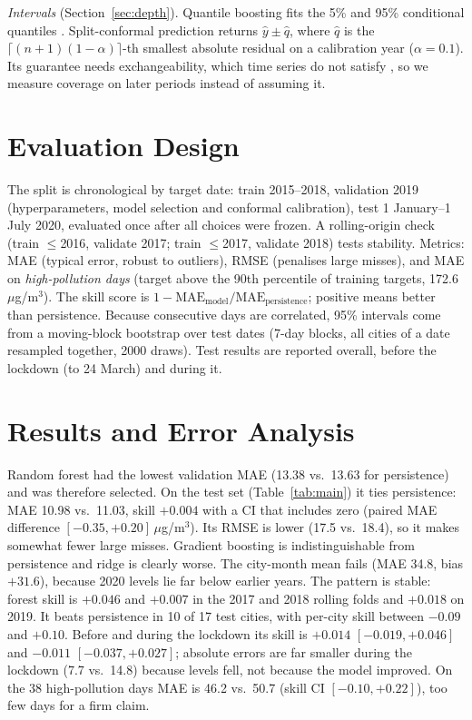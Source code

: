 \documentclass{article}
\begin{document}
\emph{Intervals} (Section~\ref{sec:depth}). Quantile boosting fits the 5\% and 95\% conditional quantiles \citep{koenker}. Split-conformal prediction \citep{lei} returns $\hat y\pm\hat q$, where $\hat q$ is the $\lceil (n{+}1)(1{-}\alpha)\rceil$-th smallest absolute residual on a calibration year ($\alpha=0.1$). Its guarantee needs exchangeability, which time series do not satisfy \citep{barber}, so we measure coverage on later periods instead of assuming it.

\section{Evaluation Design}
The split is chronological by target date: train 2015--2018, validation 2019 (hyperparameters, model selection and conformal calibration), test 1 January--1 July 2020, evaluated once after all choices were frozen. A rolling-origin check (train $\le$2016, validate 2017; train $\le$2017, validate 2018) tests stability. Metrics: MAE (typical error, robust to outliers), RMSE (penalises large misses), and MAE on \emph{high-pollution days} (target above the 90th percentile of training targets, 172.6\,$\mu$g/m$^3$). The skill score is $1-\mathrm{MAE}_{\text{model}}/\mathrm{MAE}_{\text{persistence}}$; positive means better than persistence. Because consecutive days are correlated, 95\% intervals come from a moving-block bootstrap \citep{kunsch} over test dates (7-day blocks, all cities of a date resampled together, 2000 draws). Test results are reported overall, before the lockdown (to 24 March) and during it.

\section{Results and Error Analysis}
\begin{table}[t]
\caption{2020 test results ($n=3013$; MAE and RMSE in $\mu$g/m$^3$; high $=$ 38 days above 172.6; pre/lock $=$ before/during lockdown). Skill is relative to persistence with block-bootstrap 95\% CI.}
\label{tab:main}
\centering\small\setlength{\tabcolsep}{3pt}

\end{table}
Random forest had the lowest validation MAE (13.38 vs.\ 13.63 for persistence) and was therefore selected. On the test set (Table~\ref{tab:main}) it ties persistence: MAE 10.98 vs.\ 11.03, skill $+0.004$ with a CI that includes zero (paired MAE difference $[-0.35,+0.20]$\,$\mu$g/m$^3$). Its RMSE is lower (17.5 vs.\ 18.4), so it makes somewhat fewer large misses. Gradient boosting is indistinguishable from persistence and ridge is clearly worse. The city-month mean fails (MAE 34.8, bias $+31.6$), because 2020 levels lie far below earlier years. The pattern is stable: forest skill is $+0.046$ and $+0.007$ in the 2017 and 2018 rolling folds and $+0.018$ on 2019. It beats persistence in 10 of 17 test cities, with per-city skill between $-0.09$ and $+0.10$. Before and during the lockdown its skill is $+0.014$ $[-0.019,+0.046]$ and $-0.011$ $[-0.037,+0.027]$; absolute errors are far smaller during the lockdown (7.7 vs.\ 14.8) because levels fell, not because the model improved. On the 38 high-pollution days MAE is 46.2 vs.\ 50.7 (skill CI $[-0.10,+0.22]$), too few days for a firm claim.
\end{document}

